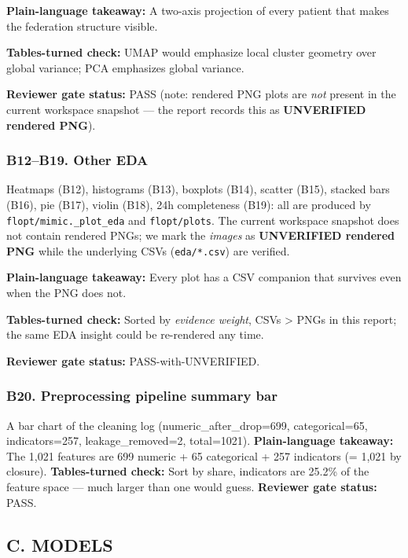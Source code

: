 \documentclass{article}
\begin{document}
\textbf{Plain-language takeaway:} A two-axis projection of every patient that makes the federation structure visible.


\textbf{Tables-turned check:} UMAP would emphasize local cluster geometry over global variance; PCA emphasizes global variance.


\textbf{Reviewer gate status:} PASS (note: rendered PNG plots are \emph{not} present in the current workspace snapshot --- the report records this as \textbf{UNVERIFIED rendered PNG}).


\subsubsection{B12--B19. Other EDA}


Heatmaps (B12), histograms (B13), boxplots (B14), scatter (B15), stacked bars (B16), pie (B17), violin (B18), 24h completeness (B19): all are produced by \texttt{flopt/mimic.\_plot\_eda} and \texttt{flopt/plots}. The current workspace snapshot does not contain rendered PNGs; we mark the \emph{images} as \textbf{UNVERIFIED rendered PNG} while the underlying CSVs (\texttt{eda/*.csv}) are verified.


\textbf{Plain-language takeaway:} Every plot has a CSV companion that survives even when the PNG does not.


\textbf{Tables-turned check:} Sorted by \emph{evidence weight}, CSVs > PNGs in this report; the same EDA insight could be re-rendered any time.


\textbf{Reviewer gate status:} PASS-with-UNVERIFIED.


\subsubsection{B20. Preprocessing pipeline summary bar}


A bar chart of the cleaning log (numeric\_after\_drop=699, categorical=65, indicators=257, leakage\_removed=2, total=1021). \textbf{Plain-language takeaway:} The 1,021 features are 699 numeric + 65 categorical + 257 indicators (= 1,021 by closure). \textbf{Tables-turned check:} Sort by share, indicators are 25.2\% of the feature space --- much larger than one would guess. \textbf{Reviewer gate status:} PASS.


\subsection{C. MODELS}
\end{document}
